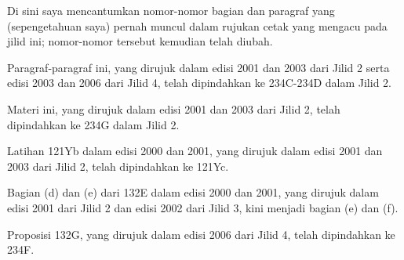 
\gdef\topparagraph{}
\gdef\bottomparagraph{}
\gdef\newparagraph{}

\def\chaptername{Konkordansi}
\def\sectionname{Konkordansi}

\newsection{}

\medskip

Di sini saya mencantumkan nomor-nomor bagian dan paragraf yang (sepengetahuan
saya) pernah muncul dalam rujukan cetak yang mengacu pada jilid ini;
nomor-nomor tersebut kemudian telah diubah.

\medskip

 Paragraf-paragraf ini, yang dirujuk
dalam edisi 2001 dan 2003 dari Jilid 2 serta edisi 2003 dan 2006 dari Jilid 4, telah
dipindahkan ke 234C-234D dalam Jilid 2.

 Materi ini, yang dirujuk dalam edisi 2001
dan 2003 dari Jilid 2, telah dipindahkan ke 234G dalam Jilid 2.

 Latihan 1{}21Yb dalam edisi
2000 dan 2001, yang dirujuk dalam edisi 2001 dan 2003 dari Jilid 2, telah
dipindahkan ke 121Yc.

Bagian (d) dan (e) dari 1{}32E dalam edisi 2000 dan 2001, yang dirujuk
dalam edisi 2001 dari Jilid 2 dan edisi 2002 dari Jilid 3, kini menjadi bagian (e)
dan (f).

 Proposisi 1{}32G, yang dirujuk dalam
edisi 2006 dari Jilid 4, telah dipindahkan ke 234F.

